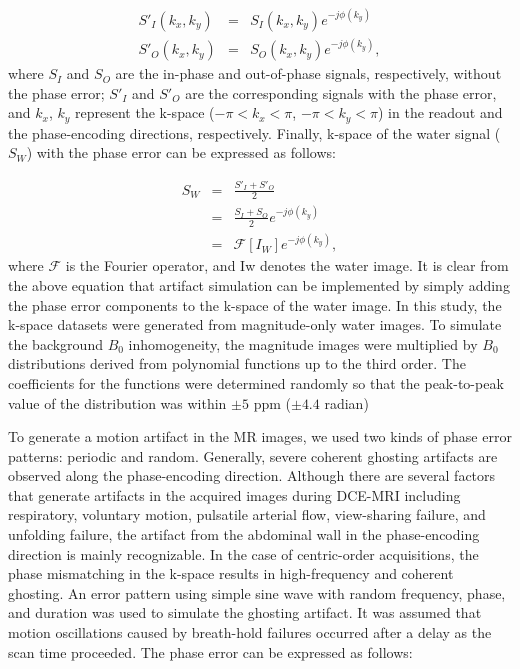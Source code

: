 \documentclass[num-refs]{wiley-article}
\begin{document}
\begin{eqnarray}
	S'_I(k_x, k_y) &=& S_I (k_x, k_y) e^{-j\phi(k_y)}\\
 	S'_O(k_x, k_y) &=& S_O (k_x, k_y) e^{-j\phi(k_y)},
\end{eqnarray}
where $S_I$ and $S_O$ are the in-phase and out-of-phase signals, respectively, without the phase error; $S'_I$ and $S'_O$ are the corresponding signals with the phase error, and $k_x$, $k_y$ represent the k-space ($-\pi < k_x < \pi$, $-\pi < k_y < \pi$) in the readout and the phase-encoding directions, respectively. Finally, k-space of the water signal ($S_W$) with the phase error can be expressed as follows:

\begin{eqnarray}
	S_W &=& \frac{S'_I+S'_O}{2}\\
 	 	&=& \frac{S_I+S_O}{2}e^{-j\phi(k_y)}\\
    	&=& \mathcal{F}[I_W]e^{-j\phi(k_y)},
\end{eqnarray}
where $\mathcal{F}$ is the Fourier operator, and Iw denotes the water image. It is clear from the above equation that artifact simulation can be implemented by simply adding the phase error components to the k-space of the water image. In this study, the k-space datasets were generated from magnitude-only water images. To simulate the background $B_0$ inhomogeneity, the magnitude images were multiplied by $B_0$ distributions derived from polynomial functions up to the third order. The coefficients for the functions were determined randomly so that the peak-to-peak value of the distribution was within $\pm5$ ppm ($\pm4.4$ radian)

To generate a motion artifact in the MR images, we used two kinds of phase error patterns: periodic and random. Generally, severe coherent ghosting artifacts are observed along the phase-encoding direction. Although there are several factors that generate artifacts in the acquired images during DCE-MRI including respiratory, voluntary motion, pulsatile arterial flow, view-sharing failure, and unfolding failure\cite{stadler2007artifacts}\cite{arena1995mr}, the artifact from the abdominal wall in the phase-encoding direction is mainly recognizable. In the case of centric-order acquisitions, the phase mismatching in the k-space results in high-frequency and coherent ghosting. An error pattern using simple sine wave with random frequency, phase, and duration was used to simulate the ghosting artifact. It was assumed that motion oscillations caused by breath-hold failures occurred after a delay as the scan time proceeded. The phase error can be expressed as follows:
\end{document}
